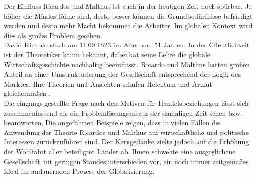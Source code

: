 %
 Der Einfluss Ricardos und Malthus ist auch in der heutigen Zeit noch spürbar. Je höher die Mindestlöhne sind, desto besser können die Grundbedürfnisse befriedigt werden und desto mehr Macht bekommen die Arbeiter. Im globalen Kontext wird dies als großes Problem gesehen. \\
%
 David Ricardo starb am 11.09.1823 im Alter von 51 Jahren. In der Öffentlichkeit ist der Theoretiker kaum bekannt, dabei hat seine Lehre die globale Wirtschaftsgeschichte nachhaltig beeinflusst. Ricardo und Malthus hatten großen Anteil an einer Umstrukturierung der Gesellschaft entsprechend der Logik des Marktes. Ihre Theorien und Ansichten schufen Reichtum und Armut gleichermaßen \cite{Heilbroner.2011}.\\
%

Die eingangs gestellte Frage nach den Motiven für Handelsbeziehungen lässt sich zusammenfassend als ein Problemlösungsansatz der damaligen Zeit sehen bzw. beantworten. Die angeführten Beispiele zeigen, dass in vielen Fällen die Anwendung der Theorie Ricardos und Malthus auf wirtschaftliche und politische Interessen zurückzuführen sind. Der Kerngedanke zielte jedoch auf die Erhöhung der Wohlfahrt aller beteiligter Länder ab. Ihnen schwebte eine ausgeglichene Gesellschaft mit geringen Standesunterschieden vor, ein noch immer zeitgemäßes Ideal im andauernden Prozess der Globalisierung.
%
